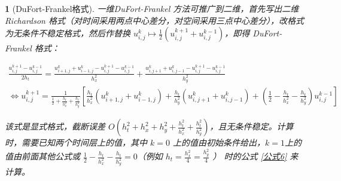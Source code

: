 \documentclass[zihao=5,UTF8]{report}
\theoremstyle{MyTheoremStyle} %
\theoremstyle{MySubsubsectionStyle} %
\newtheorem{definition}{}
\begin{document}
\begin{definition}[DuFort-Frankel格式]

一维DuFort-Frankel 方法可推广到二维，首先写出二维 Richardson 格式（对时间采用两点中心差分，对空间采用三点中心差分），改格式为无条件不稳定格式，然后作替换 $u_{i,j}^{k} \longmapsto \frac12(u_{i,j}^{k+1}+u_{i,j}^{k-1})$，即得 DuFort-Frankel 格式：

\begin{gather}
    \frac{u_{i,j}^{k+1}-u_{i,j}^{k-1}}{2h_t}=\frac{u_{i+1,j}^k+u_{i-1,j}^k-u_{i,j}^{k+1}-u_{i,j}^{k-1}}{h_x^2}+\frac{u_{i,j+1}^k+u_{i,j-1}^k-u_{i,j}^{k+1}-u_{i,j}^{k-1}}{h_y^2} \\ 
    \Longleftrightarrow    u_{i,j}^{k+1}= \frac{1}{\frac{1}{2} + \frac{h_t}{h_x^2} + \frac{h_t}{h_y^2}} \left[\frac{h_t}{h_x^2}(u_{i+1,j}^{k}+u_{i-1,j}^{k})  + \frac{h_t}{h_y^2}(u_{i,j+1}^{k}+u_{i,j-1}^{k}) + (\frac{1}{2} - \frac{h_t}{h_x^2} - \frac{h_t}{h_y^2})u_{i,j}^{k-1} \right] \label{公式6}
\end{gather}

该式是显式格式，截断误差 $O(h_t^{2}+h_x^{2} + h_y^2 +\frac{h_t^{2}}{h_x^{2}} + \frac{h_t^{2}}{h_y^{2}})$，且无条件稳定。计算时，需要已知两个时间层上的值，其中 $k = 0$ 上的值由初始条件给出，$k = 1$上的值由前面其他公式或 $\frac{1}{2} - \frac{h_t}{h_x^2} - \frac{h_t}{h_y^2} = 0$（例如 $h_t = \frac{h_x^2}{4} = \frac{h_y^2}{4 }$ ） 时的公式 \ref{公式6}  来计算。



\end{definition}
\end{document}
